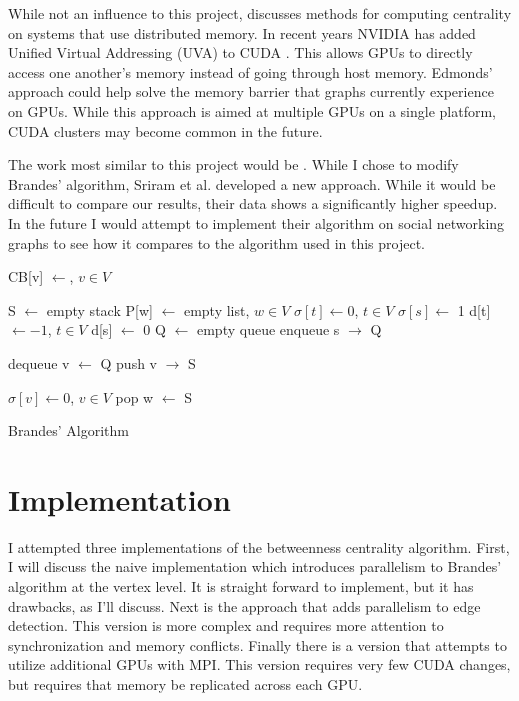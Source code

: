 \documentclass[10pt,twocolumn]{article}
\begin{document}
While not an influence to this project, \cite{distributedCentrality} discusses methods for computing centrality on systems that use distributed memory. In recent years NVIDIA has added Unified Virtual Addressing (UVA) to CUDA \cite{cudaUVA}. This allows GPUs to directly access one another's memory instead of going through host memory. Edmonds' approach could help solve the memory barrier that graphs currently experience on GPUs. While this approach is aimed at multiple GPUs on a single platform, CUDA clusters may become common in the future.

The work most similar to this project would be \cite{evalCentrality}. While I chose to modify Brandes' algorithm, Sriram et al. developed a new approach. While it would be difficult to compare our results, their data shows a significantly higher speedup. In the future I would attempt to implement their algorithm on social networking graphs to see how it compares to the algorithm used in this project.

\begin{algorithm}[h!]
CB[v] $\leftarrow$, $v \in V$\;
{
	S $\leftarrow$ empty stack\;
	P[w] $\leftarrow$ empty list, $w \in V$\;
	$\sigma [t] \leftarrow 0$, $t \in V$\; $\sigma [s] \leftarrow$ 1\;
	d[t] $\leftarrow - 1$, $t \in V$\; d[s] $\leftarrow$ 0\;
	Q $\leftarrow$ empty queue\;
	enqueue s $\rightarrow$ Q\;
	{
		dequeue v $\leftarrow$ Q\;
		push v $\rightarrow$ S\;
		{
			
		}	
	}


	$\sigma[v] \leftarrow 0$, $v \in V$\;
	{
		pop w $\leftarrow$ S\;
	}
}

\caption{Brandes' Algorithm}
\label{alg:Brande}
\end{algorithm}
 
\section{Implementation}
I attempted three implementations of the betweenness centrality algorithm. First, I will discuss the naive implementation which introduces parallelism to Brandes' algorithm at the vertex level. It is straight forward to implement, but it has drawbacks, as I'll discuss. Next is the approach that adds parallelism to edge detection. This version is more complex and requires more attention to synchronization and memory conflicts. Finally there is a version that attempts to utilize additional GPUs with MPI. This version requires very few CUDA changes, but requires that memory be replicated across each GPU.
 
\end{document}
